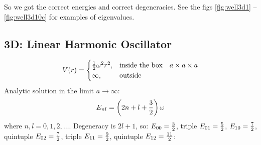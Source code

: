 So we got the correct energies and correct degeneracies. See the figs
\ref{fig:well3d1} -- \ref{fig:well3d10c} for examples of eigenvalues.




\subsection{3D: Linear Harmonic Oscillator}

$$V(r)=\begin{cases}{\textstyle{1\over2}}\omega^2r^2,&\text{inside the box}\quad a\times a\times a \\
\infty, & \text{outside}\end{cases}$$
Analytic solution in the limit $a\to\infty$:
$$E_{nl}=\left(2n+l+{3\over2}\right)\omega$$
where $n, l = 0, 1, 2, \dots$.
Degeneracy is $2l+1$, so:
$E_{00} = {3\over2}$,
triple $E_{01} = {5\over2}$,
$E_{10} = {7\over2}$,
quintuple $E_{02} = {7\over2}$,
triple $E_{11} = {9\over2}$,
quintuple $E_{12} = {11\over2}$:


